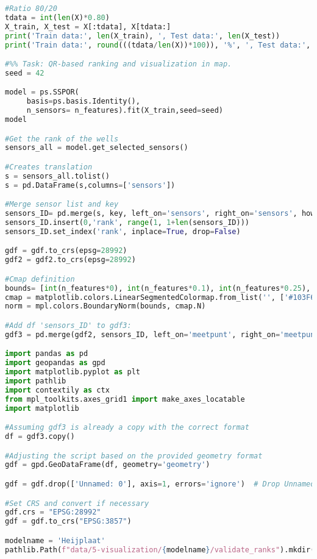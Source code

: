 \begin{lstlisting}[language=Python]
#Ratio 80/20
tdata = int(len(X)*0.80)
X_train, X_test = X[:tdata], X[tdata:]
print('Train data:', len(X_train), ', Test data:', len(X_test))
print('Train data:', round(((tdata/len(X))*100)), '%', ', Test data:', 100-round(((tdata/len(X))*100)), '%')

#%% Task: QR-based ranking and visualization in map. 
seed = 42 

model = ps.SSPOR(
     basis=ps.basis.Identity(),
     n_sensors= n_features).fit(X_train,seed=seed)
model

#Get the rank of the wells
sensors_all = model.get_selected_sensors()

#Creates translation
s = sensors_all.tolist()
s = pd.DataFrame(s,columns=['sensors'])

#Merge sensor list and key
sensors_ID= pd.merge(s, key, left_on='sensors', right_on='sensors', how='left')
sensors_ID.insert(0,'rank', range(1, 1+len(sensors_ID)))
sensors_ID.set_index('rank', inplace=True, drop=False)

gdf = gdf.to_crs(epsg=28992)
gdf2 = gdf2.to_crs(epsg=28992)

#Cmap definition
bounds= [int(n_features*0), int(n_features*0.1), int(n_features*0.25), int(n_features*0.5),int(n_features*0.75),int(n_features*0.9), int(n_features*1)]
cmap = matplotlib.colors.LinearSegmentedColormap.from_list('', ['#103F6E','#5AA2CC','#DEEEF7','#FBD9CA','#EF8A62','#941F2D'])
norm = mpl.colors.BoundaryNorm(bounds, cmap.N)

#Add df 'sensors_ID' to gdf3: 
gdf3 = pd.merge(gdf2, sensors_ID, left_on='meetpunt', right_on='meetpunt', sort=False, how='right').to_crs(epsg=28992)

import pandas as pd
import geopandas as gpd
import matplotlib.pyplot as plt
import pathlib
import contextily as ctx
from mpl_toolkits.axes_grid1 import make_axes_locatable
import matplotlib

#Assuming gdf3 is already a copy with the correct format
df = gdf3.copy()

#Adjusting the script based on the provided geometry format
gdf = gpd.GeoDataFrame(df, geometry='geometry')

gdf = gdf.drop(['Unnamed: 0'], axis=1, errors='ignore')  # Drop Unnamed if exists

#Set CRS and convert if necessary
gdf.crs = "EPSG:28992"
gdf = gdf.to_crs("EPSG:3857")

modelname = 'Heijplaat'
pathlib.Path(f"data/5-visualization/{modelname}/validate_ranks").mkdir(parents=True, exist_ok=True)


\end{lstlisting}
